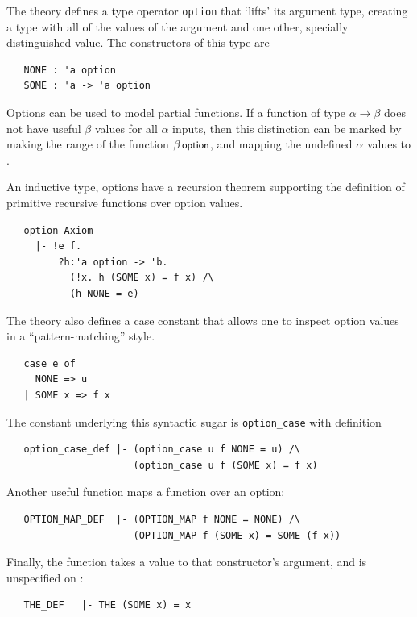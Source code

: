 The theory  defines a type operator \verb+option+
that `lifts' its argument type, creating a type with all of the
values of the argument and one other, specially distinguished value.
The constructors of this type are
\begin{hol}
\begin{verbatim}
   NONE : 'a option
   SOME : 'a -> 'a option
\end{verbatim}
\end{hol}
Options can be used to model partial functions.  If a function of type
$\alpha\rightarrow\beta$ does not have useful $\beta$ values for all
$\alpha$ inputs, then this distinction can be marked by making the
range of the function $\beta\,\mbox{\small{\textbf{\sf{option}}}}$, and mapping the
undefined $\alpha$ values to .

An inductive type, options have a recursion theorem supporting the
definition of primitive recursive functions over option values.
%
\begin{hol}
\begin{verbatim}
   option_Axiom
     |- !e f.
         ?h:'a option -> 'b.
           (!x. h (SOME x) = f x) /\
           (h NONE = e)
\end{verbatim}
\end{hol}
The  theory also defines a case constant that allows
one to inspect option values in a ``pattern-matching'' style.
\begin{hol}
\begin{verbatim}
   case e of
     NONE => u
   | SOME x => f x
\end{verbatim}
\end{hol}
%
The constant underlying this syntactic sugar is \verb+option_case+
with definition
\begin{hol}
\begin{verbatim}
   option_case_def |- (option_case u f NONE = u) /\
                      (option_case u f (SOME x) = f x)
\end{verbatim}
\end{hol}
%
Another useful function maps a function over an option:
%
\begin{hol}
\begin{verbatim}
   OPTION_MAP_DEF  |- (OPTION_MAP f NONE = NONE) /\
                      (OPTION_MAP f (SOME x) = SOME (f x))
\end{verbatim}
\end{hol}
Finally, the \holtxt{THE} function takes a \holtxt{SOME}
value to that constructor's argument, and is unspecified on
:
\begin{hol}
\begin{verbatim}
   THE_DEF   |- THE (SOME x) = x
\end{verbatim}
\end{hol}

